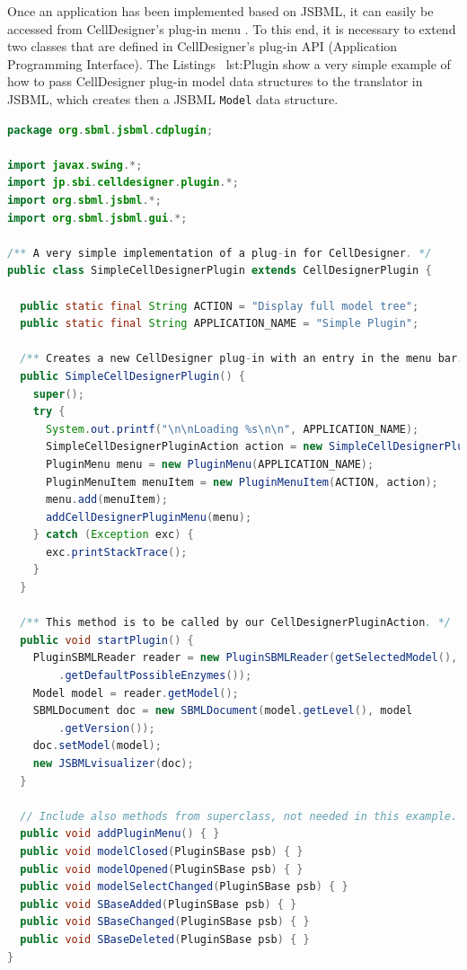 \documentclass[
  BCOR12mm,
  letterpaper,
  11pt,
  headsepline,
  pointlessnumbers,
  tablecaptionabove,
  onelinecaption,
  headinclude,
  appendixprefix,
  idxtotoc,
  bibtotoc,
  twoside,
  titlepage
]{scrartcl}
\begin{document}
Once an application has been implemented based on JSBML, it can easily be
accessed from CellDesigner's plug-in menu \citep{Funahashi2003}. To this end,
it is necessary to extend two classes that are defined in CellDesigner's plug-in
API (Application Programming Interface). The Listings~
{lst:Plugin} show a very simple example of how to pass CellDesigner plug-in
model data structures to the translator in JSBML,
which creates then a JSBML \texttt{Model} data structure.

% 
\begin{lstlisting}[language=Java,float,caption={A simple example for a
CellDesigner plug-in using JSBML as a communication layer},label=lst:Plugin]
package org.sbml.jsbml.cdplugin;

import javax.swing.*;
import jp.sbi.celldesigner.plugin.*;
import org.sbml.jsbml.*;
import org.sbml.jsbml.gui.*;

/** A very simple implementation of a plug-in for CellDesigner. */
public class SimpleCellDesignerPlugin extends CellDesignerPlugin {

  public static final String ACTION = "Display full model tree";
  public static final String APPLICATION_NAME = "Simple Plugin";

  /** Creates a new CellDesigner plug-in with an entry in the menu bar. */
  public SimpleCellDesignerPlugin() {
    super();
    try {
      System.out.printf("\n\nLoading %s\n\n", APPLICATION_NAME);
      SimpleCellDesignerPluginAction action = new SimpleCellDesignerPluginAction(this);
      PluginMenu menu = new PluginMenu(APPLICATION_NAME);
      PluginMenuItem menuItem = new PluginMenuItem(ACTION, action);
      menu.add(menuItem);
      addCellDesignerPluginMenu(menu);
    } catch (Exception exc) {
      exc.printStackTrace();
    }
  }

  /** This method is to be called by our CellDesignerPluginAction. */
  public void startPlugin() {
    PluginSBMLReader reader = new PluginSBMLReader(getSelectedModel(), SBO
        .getDefaultPossibleEnzymes());
    Model model = reader.getModel();
    SBMLDocument doc = new SBMLDocument(model.getLevel(), model
        .getVersion());
    doc.setModel(model);
    new JSBMLvisualizer(doc);
  }

  // Include also methods from superclass, not needed in this example.
  public void addPluginMenu() { }
  public void modelClosed(PluginSBase psb) { }
  public void modelOpened(PluginSBase psb) { }
  public void modelSelectChanged(PluginSBase psb) { }
  public void SBaseAdded(PluginSBase psb) { }
  public void SBaseChanged(PluginSBase psb) { }
  public void SBaseDeleted(PluginSBase psb) { }
}
\end{lstlisting}
\end{document}
